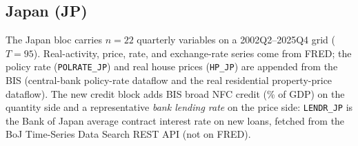 \subsection{Japan (JP)}\label{sec:data-jp}

The Japan bloc carries $n=22$ quarterly variables on a 2002Q2--2025Q4
grid ($T=95$). Real-activity, price, rate, and exchange-rate series come
from FRED; the policy rate (\texttt{POLRATE\_JP}) and real house prices
(\texttt{HP\_JP}) are appended from the BIS (central-bank policy-rate
dataflow and the real residential property-price dataflow). The new
credit block adds BIS broad NFC credit (\% of GDP) on the quantity side
and a representative \emph{bank lending rate} on the price side:
\texttt{LENDR\_JP} is the Bank of Japan average contract interest rate on
new loans, fetched from the BoJ Time-Series Data Search REST API (not on
FRED).

